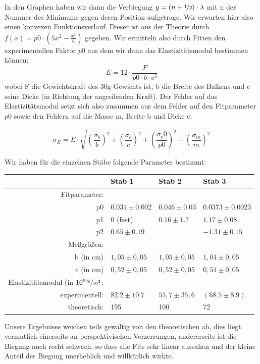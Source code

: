In den Graphen haben wir dann die Verbiegung $y = (n + \nicefrac{1}{2}) \cdot \lambda$ mit n der Nummer des Minimums gegen deren Position aufgetrage. Wir erwarten hier also einen konvexen Funktionsverlauf. Dieser ist aus der Theorie durch 
$f(x) = p0 \cdot (5 x^2  - \frac{x^3}{6})$ gegeben. Wir ermitteln also durch Fitten den experimentellen Faktor $p0$ aus dem wir dann das Elastizitätsmodul bestimmen können: 
\[
 E = 12 \cdot \frac{F}{  p0 \cdot b \cdot c^3}
\]
wobei F die Gewichtskraft des 30g-Gewichts ist, b die Breite des Balkens und c seine Dicke (in Richtung der angreifenden Kraft). Der Fehler auf das Elastizitätsmodul setzt sich also zusammen aus dem Fehler auf den Fitparameter $p0$ sowie den Fehlern auf die Masse m, Breite b und Dicke c:

\[
  \sigma_E = E \cdot \sqrt{\left(\frac{\sigma_b}{b}\right)^2 + \left(\frac{\sigma_c}{c}\right)^2 + \left(\frac{\sigma_p0}{p0}\right)^2 + \left(\frac{\sigma_m}{m}\right)^2}
\]

Wir haben für die einzelnen Stäbe folgende Parameter bestimmt:


\begin{tabular}{rlll}
 \toprule
 & Stab 1 & Stab 2 & Stab 3 \\
 \midrule
Fitparameter:\\
 p0 &$0.031 \pm 0.002$ & $0.046 \pm 0.03$ & $0.0373 \pm 0.0023$\\ %
 p1 & 0 (fest) &$ 0.16 \pm 1.7$ & $1.17 \pm 0.08$\\
 p2 & $0.65 \pm 0.19$ & & $-1.31 \pm 0.15$\\
Meßgrößen:\\
b (in cm) &$1,05 \pm 0,05$ & $1,05 \pm 0,05$ & $1,04 \pm 0,05$ \\
c (in cm) & $0,52 \pm 0,05$ & $0,52 \pm 0,05$ & $0,51 \pm 0,05$ \\
Elastizitätsmodul (in $10^9 \nicefrac{N}{m^2}$:\\
experimentell: & $82.2 \pm 10.7$ & $55,7 \pm 35,6$ & $(68.5 \pm 8.9) $ \\
theoretisch: & 195 & 100 & 72 \\
\bottomrule
\end{tabular}

Unsere Ergebnisse weichen teils gewaltig von den theoretischen ab, dies liegt vermutlich einerseits an perspektivischen Verzerrungen, andererseits ist die Biegung auch recht schwach, so dass alle Fits sehr linear aussahen und der kleine Anteil der Biegung unerheblich und willkürlich wirkte.
